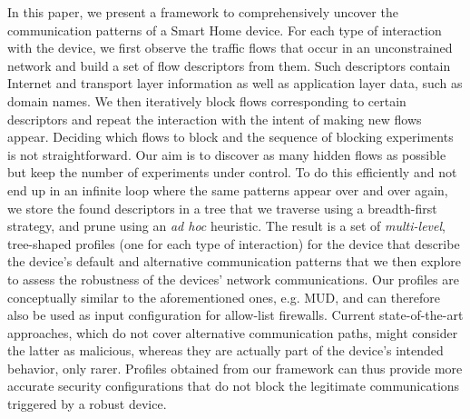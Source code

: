
In this paper, we present a framework to comprehensively uncover the communication patterns of a Smart Home device. For each type of interaction with the device, we first observe the traffic flows that occur in an unconstrained network and build a set of flow descriptors from them.
Such descriptors contain Internet and transport layer information as well as application layer data, such as domain names. We then iteratively block flows corresponding to certain descriptors and repeat the interaction with the intent of making new flows appear. 
Deciding which flows to block and the sequence of blocking experiments is not straightforward. 
Our aim is to discover as many hidden flows as possible but keep the number of experiments under control. 
To do this efficiently and not end up in an infinite loop where the same patterns appear over and over again, we store the found descriptors in a tree that we traverse using a breadth-first strategy,
and prune using an \textit{ad hoc} heuristic.
The result is a set of \emph{multi-level}, tree-shaped profiles (one for each type of interaction) for the device that describe the device's default and alternative communication patterns that we then explore to assess the robustness of the devices' network communications.
Our profiles are conceptually similar to the aforementioned ones, e.g. MUD,
and can therefore also be used as input configuration for allow-list firewalls.
Current state-of-the-art approaches,
which do not cover alternative communication paths,
might consider the latter as malicious,
whereas they are actually part of the device's intended behavior,
only rarer. 
Profiles obtained from our framework can thus provide more accurate security configurations that do not block the legitimate communications triggered by a robust device.




